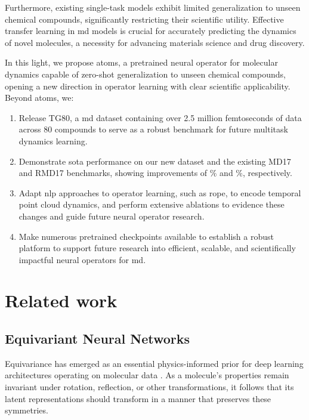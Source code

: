 Furthermore, existing single-task models exhibit limited generalization to unseen chemical compounds, significantly restricting their scientific utility. Effective transfer learning in \gls{md} models is crucial for accurately predicting the dynamics of novel molecules, a necessity for advancing materials science and drug discovery.

In this light, we propose \gls{atoms}, a pretrained neural operator for molecular dynamics capable of zero-shot generalization to unseen chemical compounds, opening a new direction in operator learning with clear scientific applicability. Beyond \gls{atoms}, we:

\begin{enumerate}
    \item Release TG80, a \gls{md} dataset containing over 2.5 million femtoseconds of data across 80 compounds to serve as a robust benchmark for future multitask dynamics learning.
    \item Demonstrate \gls{sota} performance on our new dataset and the existing MD17 and RMD17 benchmarks, showing improvements of \(\%\) and \(\%\), respectively.
    \item Adapt \gls{nlp} approaches to operator learning, such as \gls{rope}, to encode temporal point cloud dynamics, and perform extensive ablations to evidence these changes and guide future neural operator research.
    \item Make numerous pretrained checkpoints available to establish a robust platform to support future research into efficient, scalable, and scientifically impactful neural operators for \gls{md}.
\end{enumerate}

\section{Related work}
\subsection{Equivariant Neural Networks}
Equivariance has emerged as an essential physics-informed prior for deep learning architectures operating on molecular data \cite{bronstein_geometric_2021, duval_hitchhikers_2023}. As a molecule's properties remain invariant under rotation, reflection, or other transformations, it follows that its latent representations should transform in a manner that preserves these symmetries. 

